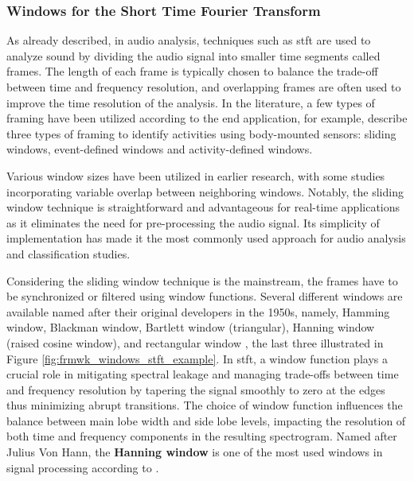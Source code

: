 \subsubsection{Windows for the Short Time Fourier Transform}
\label{subsubsec:audio_fundamentals_windowing_techniques}

As already described, in audio analysis, techniques such as \gls{stft} are used to analyze sound by dividing the audio signal into smaller time segments called frames.  The length of each frame is typically chosen to balance the trade-off between time and frequency resolution, and overlapping frames are often used to improve the time resolution of the analysis. In the literature, a few types of framing have been utilized according to the end application, for example, \textcite{Preece2009} describe three types of framing to identify activities using body-mounted sensors: sliding windows, event-defined windows and activity-defined windows.

 Various window sizes have been utilized in earlier research, with some studies incorporating variable overlap between neighboring windows. Notably, the sliding window technique is straightforward and advantageous for real-time applications as it eliminates the need for pre-processing the audio signal. Its simplicity of implementation has made it the most commonly used approach for audio analysis and classification studies.

Considering the sliding window technique is the mainstream, the frames have to be synchronized or filtered using window functions. Several different windows are available named after their original developers in the 1950s, namely, Hamming window, Blackman window, Bartlett window (triangular), Hanning window (raised cosine window), and rectangular window \cite{Smith2013}, the last three illustrated in Figure \ref{fig:frmwk_windows_stft_example}. In \gls{stft}, a window function plays a crucial role in mitigating spectral leakage and managing trade-offs between time and frequency resolution by tapering the signal smoothly to zero at the edges thus minimizing abrupt transitions. The choice of window function influences the balance between main lobe width and side lobe levels, impacting the resolution of both time and frequency components in the resulting spectrogram. Named after Julius Von Hann, the \textbf{Hanning window} is one of the most used windows in signal processing according to \textcite{Mueller2021}.

